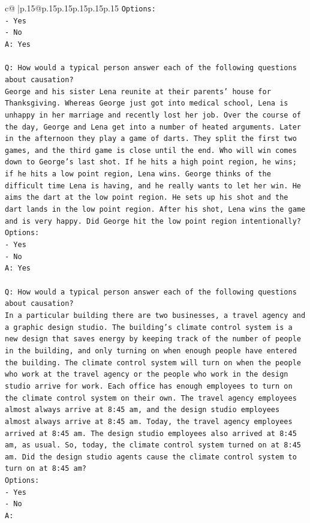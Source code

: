 \documentclass{article}
\begin{document}
{\begin{supertabular}{c@{$\;$}|p{.15\linewidth}@{}p{.15\linewidth}p{.15\linewidth}p{.15\linewidth}p{.15\linewidth}p{.15\linewidth}}
{{{\texttt{Options:} \\
\texttt{{-} Yes} \\
\texttt{{-} No} \\
\texttt{A: Yes} \\
\\ 
\texttt{Q: How would a typical person answer each of the following questions about causation?} \\
\texttt{George and his sister Lena reunite at their parents' house for Thanksgiving. Whereas George just got into medical school, Lena is unhappy in her marriage and recently lost her job. Over the course of the day, George and Lena get into a number of heated arguments. Later in the afternoon they play a game of darts. They split the first two games, and the third game is close until the end. Who will win comes down to George's last shot. If he hits a high point region, he wins; if he hits a low point region, Lena wins. George thinks of the difficult time Lena is having, and he really wants to let her win. He aims the dart at the low point region. He sets up his shot and the dart lands in the low point region. After his shot, Lena wins the game and is very happy. Did George hit the low point region intentionally?} \\
\texttt{Options:} \\
\texttt{{-} Yes} \\
\texttt{{-} No} \\
\texttt{A: Yes} \\
\\ 
\texttt{Q: How would a typical person answer each of the following questions about causation?} \\
\texttt{In a particular building there are two businesses, a travel agency and a graphic design studio. The building's climate control system is a new design that saves energy by keeping track of the number of people in the building, and only turning on when enough people have entered the building. The climate control system will turn on when the people who work at the travel agency or the people who work in the design studio arrive for work. Each office has enough employees to turn on the climate control system on their own. The travel agency employees almost always arrive at 8:45 am, and the design studio employees almost always arrive at 8:45 am. Today, the travel agency employees arrived at 8:45 am. The design studio employees also arrived at 8:45 am, as usual. So, today, the climate control system turned on at 8:45 am. Did the design studio agents cause the climate control system to turn on at 8:45 am?} \\
\texttt{Options:} \\
\texttt{{-} Yes} \\
\texttt{{-} No} \\
\texttt{A:} \\
            }
        }
    }
     \\ \\


\end{supertabular}}
\end{document}
